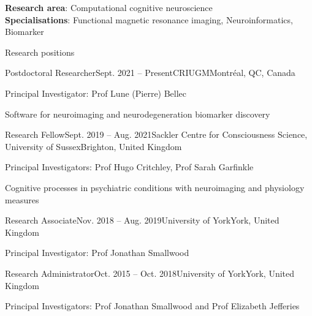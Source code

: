 \documentclass{resume} %
\begin{document}

\textbf{Research area}: 
Computational cognitive neuroscience \\ 
\textbf{Specialisations}: 
Functional magnetic resonance imaging, 
Neuroinformatics,
Biomarker




\begin{rSection}{Research positions}

  \begin{rSubsection}{Postdoctoral Researcher}{Sept. 2021 -- Present}{CRIUGM}{Montr\'eal, QC, Canada}
    \item Principal Investigator: Prof Lune (Pierre) Bellec
    \item Software for neuroimaging and neurodegeneration biomarker discovery
  \end{rSubsection}

  \begin{rSubsection}{Research Fellow}{Sept. 2019 -- Aug. 2021}{Sackler Centre for Consciousness Science, University of Sussex}{Brighton, United Kingdom}
    \item Principal Investigators: Prof Hugo Critchley, Prof Sarah Garfinkle
    \item Cognitive processes in psychiatric conditions with neuroimaging and physiology measures
  \end{rSubsection}

  \begin{rSubsection}{Research Associate}{Nov. 2018 -- Aug. 2019}{University of York}{York, United Kingdom}
  \item Principal Investigator: Prof Jonathan Smallwood
  \end{rSubsection}

  \begin{rSubsection}{Research Administrator}{Oct. 2015 -- Oct. 2018}{University of York}{York, United Kingdom}
    \item Principal Investigators: Prof Jonathan Smallwood and Prof Elizabeth Jefferies
  \end{rSubsection}

  \end{rSection}
\end{document}
